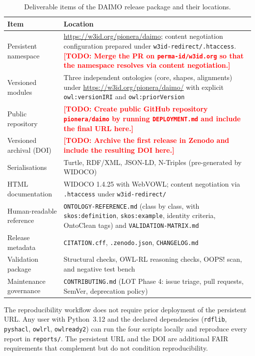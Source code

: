 \documentclass[Afour,sagev,times]{sagej}
\newcommand{\code}[1]{\texttt{#1}}
\newcommand{\TODO}[1]{\textcolor{red}{\textbf{[TODO: #1]}}}
\begin{document}
\begin{table}[t]
\small\sf\centering
\caption{Deliverable items of the DAIMO release package and their locations.\label{tab:avail}}
\begin{tabular}{@{}p{4cm}p{11cm}@{}}
\toprule
\textbf{Item} & \textbf{Location} \\
\midrule
Persistent namespace & \url{https://w3id.org/pionera/daimo}; content negotiation configuration prepared under \code{w3id-redirect/.htaccess}. \TODO{Merge the PR on \texttt{perma-id/w3id.org} so that the namespace resolves via content negotiation.} \\
Versioned modules & Three independent ontologies (core, shapes, alignments) under \url{https://w3id.org/pionera/daimo/} with explicit \code{owl:versionIRI} and \code{owl:priorVersion} \\
Public repository & \TODO{Create public GitHub repository \texttt{pionera/daimo} by running \texttt{DEPLOYMENT.md} and include the final URL here.} \\
Versioned archival (DOI) & \TODO{Archive the first release in Zenodo and include the resulting DOI here.} \\
Serialisations & Turtle, RDF/XML, JSON-LD, N-Triples (pre-generated by WIDOCO) \\
HTML documentation & WIDOCO 1.4.25 with WebVOWL; content negotiation via \code{.htaccess} under \code{w3id-redirect/} \\
Human-readable reference & \code{ONTOLOGY-REFERENCE.md} (class by class, with \code{skos:definition}, \code{skos:example}, identity criteria, OntoClean tags) and \code{VALIDATION-MATRIX.md} \\
Release metadata & \code{CITATION.cff}, \code{.zenodo.json}, \code{CHANGELOG.md} \\
Validation package & Structural checks, OWL-RL reasoning checks, OOPS! scan, and negative test bench \\
Maintenance governance & \code{CONTRIBUTING.md} (LOT Phase 4: issue triage, pull requests, SemVer, deprecation policy) \\
\bottomrule
\end{tabular}
\end{table}

The reproducibility workflow does not require prior deployment of the persistent URL. Any user with Python~3.12 and the declared dependencies (\code{rdflib}, \code{pyshacl}, \code{owlrl}, \code{owlready2}) can run the four scripts locally and reproduce every report in \code{reports/}. The persistent URL and the DOI are additional FAIR requirements that complement but do not condition reproducibility.
\end{document}
